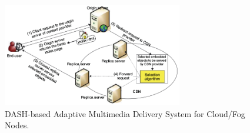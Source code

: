 

\begin{figure}[htpb]
	\centering
	\includegraphics[width=0.7\textwidth]{img/fig-intro.png}
	\caption{DASH-based Adaptive Multimedia Delivery System for Cloud/Fog Nodes.}
	\label{fig:scenario-arch}
\end{figure}






